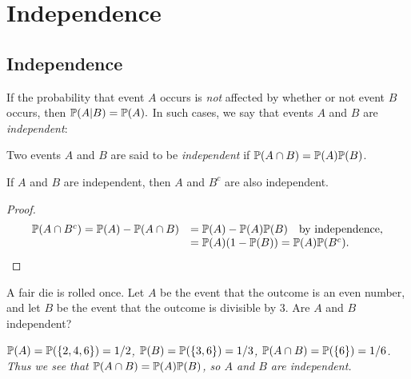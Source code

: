\chapter{Independence}\label{chap:independence}

\section{Independence}
If the probability that event $A$ occurs is \emph{not} affected by whether or not event $B$ occurs, then
$
\mathbb{P}(A|B) = \mathbb{P}(A).
$
In such cases, we say that events $A$ and $B$ are \emph{independent}:

\begin{definition}
Two events $A$ and $B$ are said to be \emph{independent} if $\mathbb{P}(A\cap B) = \mathbb{P}(A)\mathbb{P}(B)$.
\end{definition}

\begin{lemma}
If $A$ and $B$ are independent, then $A$ and $B^c$ are also independent.
\end{lemma}
\begin{proof}
\[\begin{array}{ll}
\mathbb{P}(A\cap B^c) 
	= \mathbb{P}(A) - \mathbb{P}(A\cap B)
	& = \mathbb{P}(A) - \mathbb{P}(A)\mathbb{P}(B) \quad\text{by independence,} \\
	& = \mathbb{P}(A)(1-\mathbb{P}(B))
	= \mathbb{P}(A)\mathbb{P}(B^c).
\end{array}\]
\end{proof}

\begin{example}
A fair die is rolled once. Let $A$ be the event that the outcome is an even number, and let $B$ be the event that the outcome is divisible by $3$. Are $A$ and $B$ independent?
\end{example}
\begin{solution}
\bit
\it $\mathbb{P}(A) = \mathbb{P}(\{2,4,6\}) = 1/2$, $\mathbb{P}(B) = \mathbb{P}(\{3,6\}) = 1/3$, $\mathbb{P}(A\cap B) = \mathbb{P}(\{6\}) = 1/6$.
\it Thus we see that $\mathbb{P}(A\cap B) = \mathbb{P}(A)\mathbb{P}(B)$, so $A$ and $B$ are independent.
\eit
\end{solution}

